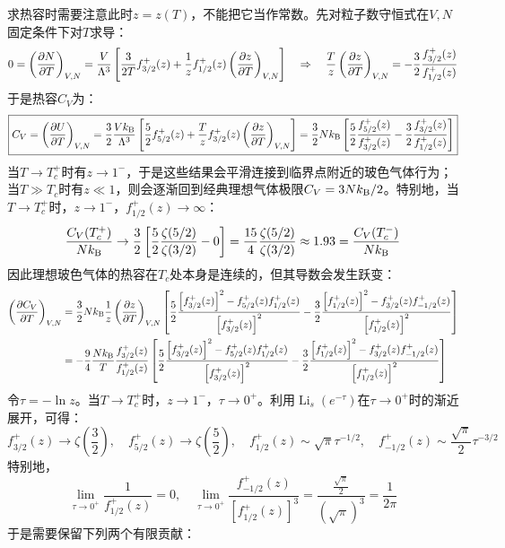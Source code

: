 求热容时需要注意此时$z=z(T)$，不能把它当作常数。先对粒子数守恒式在$V,N$固定条件下对$T$求导：
\[0=\left(\pdv{N}{T}\right)_{V,N}=\frac{V}{\Lambda^3}\left[\frac{3}{2T}f_{3/2}^+(z)+\frac{1}{z}f_{1/2}^+(z)\left(\pdv{z}{T}\right)_{V,N}\right] \quad \Rightarrow \quad \frac{T}{z}\left(\pdv{z}{T}\right)_{V,N}=-\frac{3}{2}\frac{f_{3/2}^+(z)}{f_{1/2}^+(z)}\]
于是热容$C_V$为：
\[\boxed{C_V=\left(\pdv{U}{T}\right)_{V,N}
=\frac{3}{2}\frac{Vk_{\rm B}}{\Lambda^3}\left[\frac{5}{2}f_{5/2}^+(z)+\frac{T}{z}f_{3/2}^+(z)\left(\pdv{z}{T}\right)_{V,N}\right]=\frac{3}{2}Nk_{\rm B}\left[\frac{5}{2}\frac{f_{5/2}^+(z)}{f_{3/2}^+(z)}-\frac{3}{2}\frac{f_{3/2}^+(z)}{f_{1/2}^+(z)}\right]}\]
当$T\to T_c^+$时有$z\to 1^-$，于是这些结果会平滑连接到临界点附近的玻色气体行为；当$T\gg T_c$时有$z\ll 1$，则会逐渐回到经典理想气体极限$C_V=3Nk_{\rm B}/2$。特别地，当$T \to T_c^+$时，$z \to 1^-$，$f_{1/2}^+(z) \to \infty$：
\[\frac{C_V(T_c^+)}{Nk_{\rm B}}\to\frac{3}{2}\left[\frac{5}{2}\frac{\zeta(5/2)}{\zeta(3/2)}-0\right]=\frac{15}{4}\frac{\zeta(5/2)}{\zeta(3/2)}\approx 1.93=\frac{C_V(T_c^-)}{Nk_{\rm B}}\]
因此理想玻色气体的热容在$T_c$处本身是连续的，但其导数会发生跃变：
\[\begin{aligned}
\left(\pdv{C_V}{T}\right)_{V,N}&=\frac{3}{2}Nk_{\rm B}\frac{1}{z}\left(\pdv{z}{T}\right)_{V,N}\left[\frac{5}{2}\frac{\left[f_{3/2}^+(z)\right]^2-f_{5/2}^+(z)f_{1/2}^+(z)}{\left[f_{3/2}^+(z)\right]^2}-\frac{3}{2}\frac{\left[f_{1/2}^+(z)\right]^2-f_{3/2}^+(z)f_{-1/2}^+(z)}{\left[f_{1/2}^+(z)\right]^2}\right]\\
&=-\frac{9}{4}\frac{Nk_{\rm B}}{T}\frac{f_{3/2}^+(z)}{f_{1/2}^+(z)}\left[\frac{5}{2}\frac{\left[f_{3/2}^+(z)\right]^2-f_{5/2}^+(z)f_{1/2}^+(z)}{\left[f_{3/2}^+(z)\right]^2}-\frac{3}{2}\frac{\left[f_{1/2}^+(z)\right]^2-f_{3/2}^+(z)f_{-1/2}^+(z)}{\left[f_{1/2}^+(z)\right]^2}\right]
\end{aligned}\]
令$\tau=-\ln z$。当$T\to T_c^+$时，$z\to 1^-$，$\tau\to0^+$。利用$\operatorname{Li}_s(e^{-\tau})$在$\tau\to0^+$时的渐近展开，可得：
\[f_{3/2}^+(z)\to \zeta\left(\frac{3}{2}\right),\quad f_{5/2}^+(z)\to \zeta\left(\frac{5}{2}\right),\quad f_{1/2}^+(z)\sim\sqrt{\pi}\tau^{-1/2},\quad f_{-1/2}^+(z)\sim\frac{\sqrt{\pi}}{2}\tau^{-3/2}\]
特别地，
\[\lim_{\tau\to0^+}\frac{1}{f_{1/2}^+(z)}=0,\quad \lim_{\tau\to0^+}\frac{f_{-1/2}^+(z)}{\left[f_{1/2}^+(z)\right]^3}=\frac{\frac{\sqrt{\pi}}{2}}{\left(\sqrt{\pi}\right)^3}=\frac{1}{2\pi}\]
于是需要保留下列两个有限贡献：
